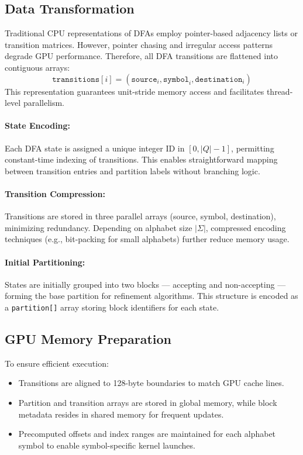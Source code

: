 \subsection{Data Transformation}

Traditional CPU representations of DFAs employ pointer-based adjacency lists or transition matrices. However, pointer chasing and irregular access patterns degrade GPU performance. Therefore, all DFA transitions are flattened into contiguous arrays:
\[
\texttt{transitions}[i] = (\texttt{source}_i, \texttt{symbol}_i, \texttt{destination}_i)
\]
This representation guarantees unit-stride memory access and facilitates thread-level parallelism. 

\paragraph{State Encoding:}  
Each DFA state is assigned a unique integer ID in $[0, |Q|-1]$, permitting constant-time indexing of transitions. This enables straightforward mapping between transition entries and partition labels without branching logic.

\paragraph{Transition Compression:}  
Transitions are stored in three parallel arrays (source, symbol, destination), minimizing redundancy. Depending on alphabet size $|\Sigma|$, compressed encoding techniques (e.g., bit-packing for small alphabets) further reduce memory usage.

\paragraph{Initial Partitioning:}  
States are initially grouped into two blocks — accepting and non-accepting — forming the base partition for refinement algorithms. This structure is encoded as a \texttt{partition[]} array storing block identifiers for each state.

\subsection{GPU Memory Preparation}

To ensure efficient execution:
\begin{itemize}
    \item Transitions are aligned to 128-byte boundaries to match GPU cache lines.
    \item Partition and transition arrays are stored in global memory, while block metadata resides in shared memory for frequent updates.
    \item Precomputed offsets and index ranges are maintained for each alphabet symbol to enable symbol-specific kernel launches.
\end{itemize}

